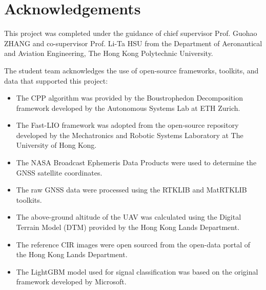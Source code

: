 \documentclass[10pt, a4paper]{article}
\begin{document}
\section{Acknowledgements}
This project was completed under the guidance of chief supervisor Prof. Guohao ZHANG and co-supervisor Prof. Li-Ta HSU from the Department of Aeronautical and Aviation Engineering, The Hong Kong Polytechnic University. 

The student team acknowledges the use of open-source frameworks, toolkits, and data that supported this project:

\begin{itemize}[noitemsep]
    \item The CPP algorithm was provided by the Boustrophedon Decomposition framework developed by the Autonomous Systems Lab at ETH Zurich.
    \item The Fast-LIO framework was adopted from the open-source repository developed by the Mechatronics and Robotic Systems Laboratory at The University of Hong Kong.
    \item The NASA Broadcast Ephemeris Data Products were used to determine the GNSS satellite coordinates.
    \item The raw GNSS data were processed using the RTKLIB and MatRTKLIB toolkits. 
    \item The above-ground altitude of the UAV was calculated using the Digital Terrain Model (DTM) provided by the Hong Kong Lands Department. 
    \item The reference CIR images were open sourced from the open-data portal of the Hong Kong Lands Department.
    \item The LightGBM model used for signal classification was based on the original framework developed by Microsoft.
\end{itemize}


 
\end{document}
